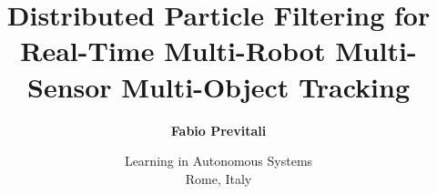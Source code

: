 \documentclass{beamer}
\title[Distributed Particle Filtering for Real-Time Multi-Robot Multi-Sensor MOT]{\Large Distributed Particle Filtering for Real-Time Multi-Robot Multi- Sensor Multi-Object Tracking}
\subtitle{}
\author[Fabio Previtali]{\Large\textbf{Fabio Previtali}}
\date[April 17, 2015]{\small Learning in Autonomous Systems\\Rome, Italy}
\begin{document}
\begin{frame}[plain]
	\titlepage
\end{frame}






\tiny
\nocite{Kasturi09}
\nocite{Berclaz11}
\nocite{Kitani12}
\nocite{Yang09}
\nocite{Andriyenko11}
\nocite{Leal11}
\nocite{Sharma09}


\end{document}
